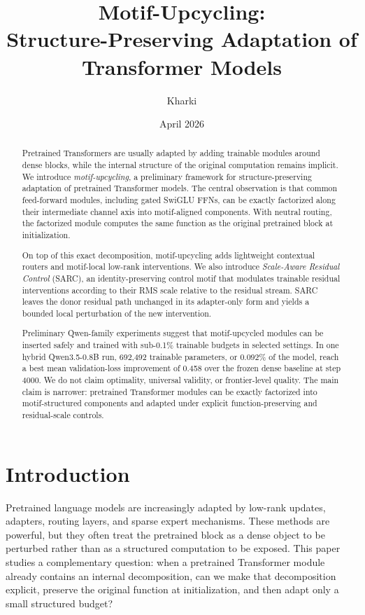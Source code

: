\documentclass[11pt]{article}
\title{Motif-Upcycling:\\
       Structure-Preserving Adaptation of Transformer Models}
\author{Kharki}
\date{April 2026}
\theoremstyle{definition}
\begin{document}
\maketitle

\begin{abstract}
Pretrained Transformers are usually adapted by adding trainable modules around dense blocks, while the internal structure of the original computation remains implicit. We introduce \emph{motif-upcycling}, a preliminary framework for structure-preserving adaptation of pretrained Transformer models. The central observation is that common feed-forward modules, including gated SwiGLU FFNs, can be exactly factorized along their intermediate channel axis into motif-aligned components. With neutral routing, the factorized module computes the same function as the original pretrained block at initialization.

On top of this exact decomposition, motif-upcycling adds lightweight contextual routers and motif-local low-rank interventions. We also introduce \emph{Scale-Aware Residual Control} (SARC), an identity-preserving control motif that modulates trainable residual interventions according to their RMS scale relative to the residual stream. SARC leaves the donor residual path unchanged in its adapter-only form and yields a bounded local perturbation of the new intervention.

Preliminary Qwen-family experiments suggest that motif-upcycled modules can be inserted safely and trained with sub-0.1\% trainable budgets in selected settings. In one hybrid Qwen3.5-0.8B run, 692,492 trainable parameters, or 0.092\% of the model, reach a best mean validation-loss improvement of 0.458 over the frozen dense baseline at step 4000. We do not claim optimality, universal validity, or frontier-level quality. The main claim is narrower: pretrained Transformer modules can be exactly factorized into motif-structured components and adapted under explicit function-preserving and residual-scale controls.
\end{abstract}


\section{Introduction}

Pretrained language models are increasingly adapted by low-rank updates, adapters, routing layers, and sparse expert mechanisms. These methods are powerful, but they often treat the pretrained block as a dense object to be perturbed rather than as a structured computation to be exposed. This paper studies a complementary question: when a pretrained Transformer module already contains an internal decomposition, can we make that decomposition explicit, preserve the original function at initialization, and then adapt only a small structured budget?
\end{document}
